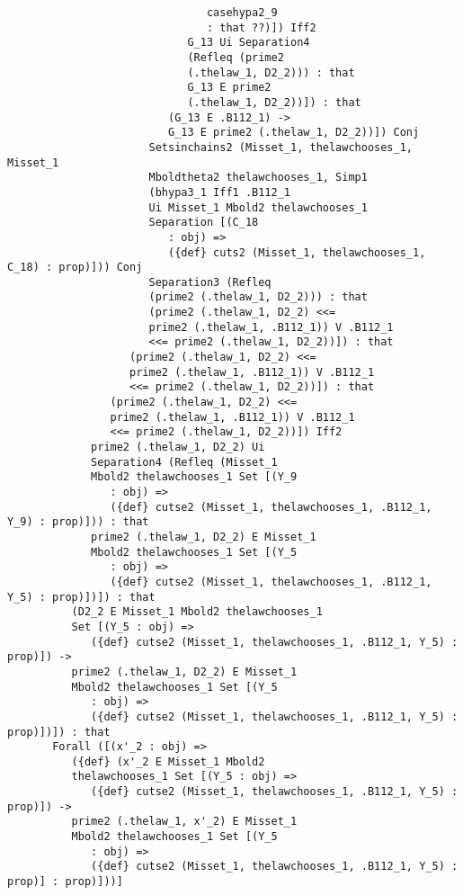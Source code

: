\documentclass[12pt]{article}
\begin{document}
\begin{verbatim}
                               casehypa2_9 
                               : that ??)]) Iff2 
                            G_13 Ui Separation4 
                            (Refleq (prime2 
                            (.thelaw_1, D2_2))) : that 
                            G_13 E prime2 
                            (.thelaw_1, D2_2))]) : that 
                         (G_13 E .B112_1) -> 
                         G_13 E prime2 (.thelaw_1, D2_2))]) Conj 
                      Setsinchains2 (Misset_1, thelawchooses_1, Misset_1 
                      Mboldtheta2 thelawchooses_1, Simp1 
                      (bhypa3_1 Iff1 .B112_1 
                      Ui Misset_1 Mbold2 thelawchooses_1 
                      Separation [(C_18 
                         : obj) => 
                         ({def} cuts2 (Misset_1, thelawchooses_1, C_18) : prop)])) Conj 
                      Separation3 (Refleq 
                      (prime2 (.thelaw_1, D2_2))) : that 
                      (prime2 (.thelaw_1, D2_2) <<= 
                      prime2 (.thelaw_1, .B112_1)) V .B112_1 
                      <<= prime2 (.thelaw_1, D2_2))]) : that 
                   (prime2 (.thelaw_1, D2_2) <<= 
                   prime2 (.thelaw_1, .B112_1)) V .B112_1 
                   <<= prime2 (.thelaw_1, D2_2))]) : that 
                (prime2 (.thelaw_1, D2_2) <<= 
                prime2 (.thelaw_1, .B112_1)) V .B112_1 
                <<= prime2 (.thelaw_1, D2_2))]) Iff2 
             prime2 (.thelaw_1, D2_2) Ui 
             Separation4 (Refleq (Misset_1 
             Mbold2 thelawchooses_1 Set [(Y_9 
                : obj) => 
                ({def} cutse2 (Misset_1, thelawchooses_1, .B112_1, Y_9) : prop)])) : that 
             prime2 (.thelaw_1, D2_2) E Misset_1 
             Mbold2 thelawchooses_1 Set [(Y_5 
                : obj) => 
                ({def} cutse2 (Misset_1, thelawchooses_1, .B112_1, Y_5) : prop)])]) : that 
          (D2_2 E Misset_1 Mbold2 thelawchooses_1 
          Set [(Y_5 : obj) => 
             ({def} cutse2 (Misset_1, thelawchooses_1, .B112_1, Y_5) : prop)]) -> 
          prime2 (.thelaw_1, D2_2) E Misset_1 
          Mbold2 thelawchooses_1 Set [(Y_5 
             : obj) => 
             ({def} cutse2 (Misset_1, thelawchooses_1, .B112_1, Y_5) : prop)])]) : that 
       Forall ([(x'_2 : obj) => 
          ({def} (x'_2 E Misset_1 Mbold2 
          thelawchooses_1 Set [(Y_5 : obj) => 
             ({def} cutse2 (Misset_1, thelawchooses_1, .B112_1, Y_5) : prop)]) -> 
          prime2 (.thelaw_1, x'_2) E Misset_1 
          Mbold2 thelawchooses_1 Set [(Y_5 
             : obj) => 
             ({def} cutse2 (Misset_1, thelawchooses_1, .B112_1, Y_5) : prop)] : prop)]))]


\end{verbatim}
\end{document}
